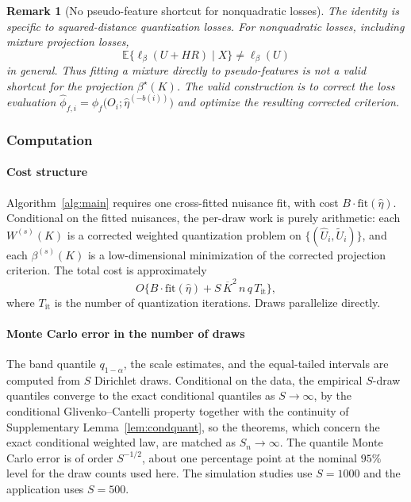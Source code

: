 \documentclass[11pt]{article}
\newtheorem{remark}{Remark}
\newcommand{\E}{\mathbb E}
\newcommand{\hateta}{\widehat\eta}
\newcommand{\hU}{\widehat U}
\newcommand{\tU}{\widetilde U}
\newcommand{\hphi}{\widehat\phi}
\begin{document}
\begin{remark}[No pseudo-feature shortcut for nonquadratic losses]\label{rem:nopseudo}
The identity is specific to squared-distance quantization losses.  For nonquadratic losses, including mixture projection losses,
\[
\E\{\ell_\beta(U+HR)\mid X\}
\ne
\ell_\beta(U)
\]
in general.  Thus fitting a mixture directly to pseudo-features is not a valid shortcut for the projection $\beta^\star(K)$.  The valid construction is to correct the loss evaluation $\hphi_{f,i}=\phi_f\bigl(O_i;\hateta^{(-b(i))}\bigr)$ and optimize the resulting corrected criterion.
\end{remark}

\subsubsection{Computation}\label{sec:computation_supp}

\paragraph{Cost structure}
Algorithm~\ref{alg:main} requires one cross-fitted nuisance fit, with cost $B\cdot\mathrm{fit}(\hateta)$.  Conditional on the fitted nuisances, the per-draw work is purely arithmetic: each $W^{(s)}(K)$ is a corrected weighted quantization problem on $\{(\hU_i,\tU_i)\}$, and each $\beta^{(s)}(K)$ is a low-dimensional minimization of the corrected projection criterion.  The total cost is approximately
\[
O\{B\cdot\mathrm{fit}(\hateta)+S\,\overline K^2\,n\,q\,T_{\mathrm{it}}\},
\]
where $T_{\mathrm{it}}$ is the number of quantization iterations.  Draws parallelize directly.

\paragraph{Monte Carlo error in the number of draws}
The band quantile $q_{1-\alpha}$, the scale estimates, and the equal-tailed intervals are computed from $S$ Dirichlet draws. Conditional on the data, the empirical $S$-draw quantiles converge to the exact conditional quantiles as $S\to\infty$, by the conditional Glivenko--Cantelli property together with the continuity of Supplementary Lemma~\ref{lem:condquant}, so the theorems, which concern the exact conditional weighted law, are matched as $S_n\to\infty$. The quantile Monte Carlo error is of order $S^{-1/2}$, about one percentage point at the nominal $95\%$ level for the draw counts used here. The simulation studies use $S=1000$ and the application uses $S=500$.
\end{document}

